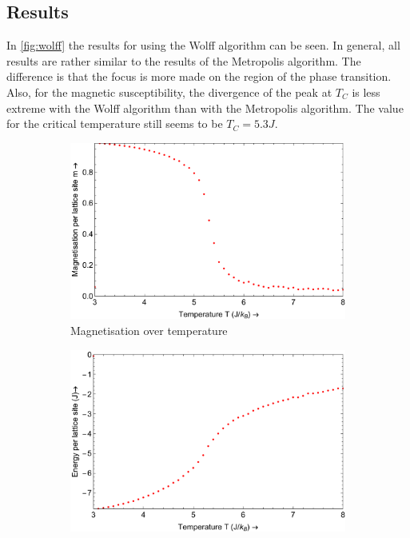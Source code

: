 \documentclass[a4paper]{article}
\begin{document}
\subsection{Results}
In \autoref{fig:wolff} the results for using the Wolff algorithm can be seen. In general, all results are rather similar to the results of the Metropolis algorithm. The difference is that the focus is more made on the region of the phase transition. Also, for the magnetic susceptibility, the divergence of the peak at $T_C$ is less extreme with the Wolff algorithm than with the Metropolis algorithm. The value for the critical temperature still seems to be $T_C=5.3 J$.
\begin{figure}[H]
	\centering
	\begin{subfigure}[b]{0.4\textwidth}
		\centering
		\includegraphics[width=\textwidth]{magplotW.pdf}
		\caption{ Magnetisation over temperature}
	\end{subfigure}%
	\begin{subfigure}[b]{0.4\textwidth}
		\centering
		\includegraphics[width=\textwidth]{eplotW.pdf}

\end{subfigure}
\end{figure}
\end{document}
